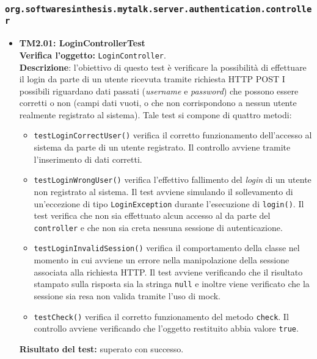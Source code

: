 \subsubsection{\texttt{org.softwaresinthesis.mytalk.server.authentication.controller}}
\begin{itemize}
\item \textbf{TM2.01: LoginControllerTest}\\
\textbf{Verifica l'oggetto:} \texttt{LoginController}.\\
\textbf{Descrizione}: l'obiettivo di questo test è verificare la possibilità di effettuare il login da parte di un utente ricevuta tramite richiesta HTTP POST I possibili  riguardano dati passati (\textit{username} e \textit{password}) che possono essere corretti o non (campi dati vuoti, o che non corrispondono a nessun utente realmente registrato al sistema).
Tale test si compone di quattro metodi:
\begin{itemize}

\item \texttt{testLoginCorrectUser()} verifica il corretto funzionamento dell'accesso al sistema da parte di un utente registrato. Il controllo avviene tramite l'inserimento di dati corretti.

\item \texttt{testLoginWrongUser()} verifica l'effettivo fallimento del \textit{login} di un utente  non registrato al sistema. Il test avviene simulando il sollevamento di un'eccezione di tipo \texttt{LoginException} durante l'esecuzione di \texttt{login()}. Il test verifica che non sia effettuato alcun accesso al  da parte del \texttt{controller} e che non sia creta nessuna sessione di autenticazione.

\item \texttt{testLoginInvalidSession()} 
verifica il comportamento della classe nel momento in cui avviene un errore nella manipolazione della sessione associata alla richiesta HTTP. Il test avviene verificando che il risultato stampato sulla risposta sia la stringa \texttt{null} e inoltre viene verificato che la sessione sia resa non valida tramite l'uso di mock.

\item \texttt{testCheck()} verifica il corretto funzionamento del metodo \texttt{check}. Il controllo avviene verificando che l'oggetto restituito abbia valore \texttt{true}.

\end{itemize}
\textbf{Risultato del test:} superato con successo.


\end{itemize}
